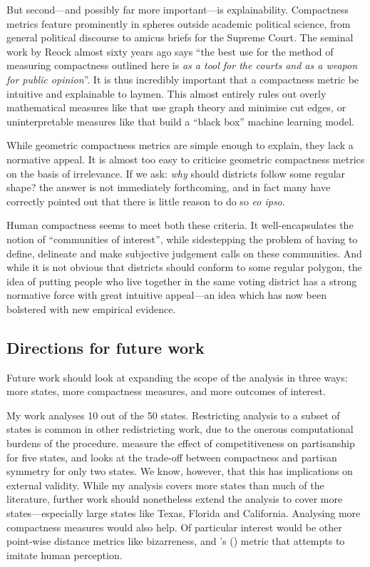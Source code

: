 \documentclass[]{article}
\begin{document}
But second---and possibly far more important---is explainability.
Compactness metrics feature prominently in spheres outside academic
political science, from general political discourse to amicus briefs for
the Supreme Court. The seminal work by Reock almost sixty years ago says
``the best use for the method of measuring compactness outlined here is
\emph{as a tool for the courts and as a weapon for public opinion}''. It
is thus incredibly important that a compactness metric be intuitive and
explainable to laymen. This almost entirely rules out overly
mathematical measures like \cite{dc2016} that use graph theory and
minimise cut edges, or uninterpretable measures like \cite{kingwp} that
build a ``black box'' machine learning model.

While geometric compactness metrics are simple enough to explain, they
lack a normative appeal. It is almost too easy to criticise geometric
compactness metrics on the basis of irrelevance. If we ask: \emph{why}
should districts follow some regular shape? the answer is not
immediately forthcoming, and in fact many have correctly pointed out
that there is little reason to do so \emph{eo ipso}.

Human compactness seems to meet both these criteria. It
well-encapsulates the notion of ``communities of interest'', while
sidestepping the problem of having to define, delineate and make
subjective judgement calls on these communities. And while it is not
obvious that districts should conform to some regular polygon, the idea
of putting people who live together in the same voting district has a
strong normative force with great intuitive appeal---an idea which has
now been bolstered with new empirical evidence.

\hypertarget{directions-for-future-work}{%
\subsection{Directions for future
work}\label{directions-for-future-work}}

Future work should look at expanding the scope of the analysis in three
ways: more states, more compactness measures, and more outcomes of
interest.

My work analyses 10 out of the 50 states. Restricting analysis to a
subset of states is common in other redistricting work, due to the
onerous computational burdens of the procedure. \cite{ddj2019comp}
measure the effect of competitiveness on partisanship for five states,
and \cite{s2020} looks at the trade-off between compactness and partisan
symmetry for only two states. We know, however, that this has
implications on external validity. While my analysis covers more states
than much of the literature, further work should nonetheless extend the
analysis to cover more states---especially large states like Texas,
Florida and California. Analysing more compactness measures would also
help. Of particular interest would be other point-wise distance metrics
like bizarreness, and \citeauthor{kingwp}'s (\citeyear{kingwp}) metric
that attempts to imitate human perception.
\end{document}
